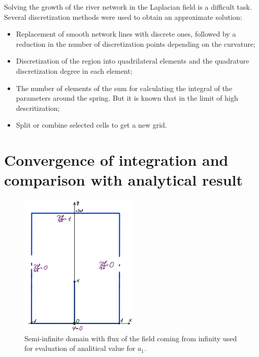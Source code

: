 \documentclass[]{pracamgr}
\begin{document}
    Solving the growth of the river network in the Laplacian field is a difficult task. Several discretization methods were used to obtain an approximate solution: 
    
    \vspace{-\topsep}
    \begin{itemize}
      \item Replacement of smooth network lines with discrete ones, followed by a reduction in the number of discretization points depending on the curvature;
      \item Discretization of the region into quadrilateral elements and the quadrature discretization degree in each element;
      \item The number of elements of the sum for calculating the integral of the parameters around the spring. But it is known that in the limit of high descritization;
      \item Split or combine selected cells to get a new grid.
    \end{itemize}
    
    \section{Convergence of integration and comparison with analytical result}

    \begin{figure}[H]
      \centering
      \includegraphics[width=0.5\textwidth]{figs/test_function_boundary.png}
      \caption{Semi-infinite domain with flux of the field coming from infinity used for evaluation of analitical value for $a_1$.}
      \label{test_boundary}
    \end{figure}
\end{document}
